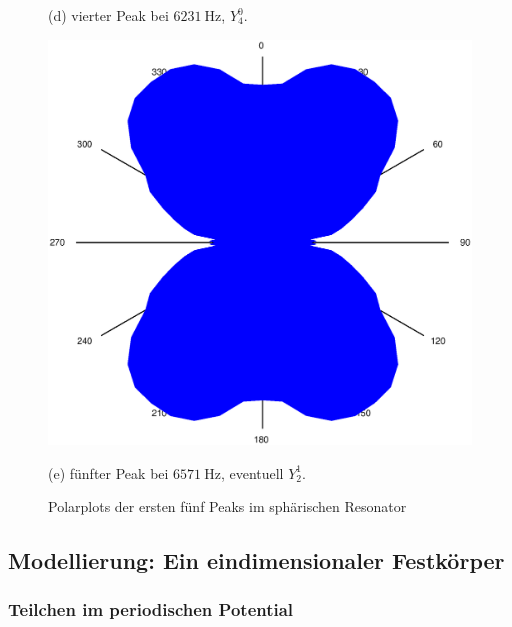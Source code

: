 \begin{figure}
\begin{minipage}{0.45\textwidth}
%
(d) vierter Peak bei $\SI{6231}{\hertz}$, $Y_4^0$.
\end{minipage}
\begin{minipage}{\textwidth}
\centering
\includegraphics[width=\linewidth*9/20,keepaspectratio]{FP-V23data/2.3_6571.732Hz.eps}

%
(e) fünfter Peak bei $\SI{6571}{\hertz}$, eventuell $Y_2^1$.
\end{minipage}
\caption{Polarplots der ersten fünf Peaks im sphärischen Resonator}
\label{fig:polar}
\end{figure}

\subsection{Modellierung: Ein eindimensionaler Festkörper}
\subsubsection{Teilchen im periodischen Potential}

